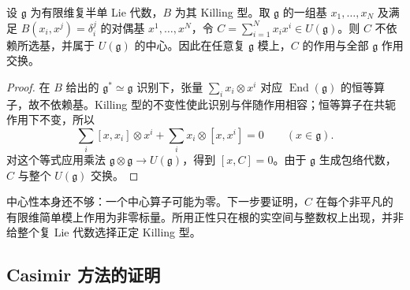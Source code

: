 \begin{proposition}\label{b5:prop:casimir-central}
	设 \(\mathfrak g\) 为有限维复半单 Lie 代数，\(B\) 为其 Killing 型。取 \(\mathfrak g\) 的一组基 \(x_1,\ldots,x_N\) 及满足 \(B(x_i,x^j)=\delta_i^j\) 的对偶基 \(x^1,\ldots,x^N\)，令 \(C=\sum_{i=1}^N x_ix^i\in U(\mathfrak g)\)。则 \(C\) 不依赖所选基，并属于 \(U(\mathfrak g)\) 的中心。因此在任意复 \(\mathfrak g\) 模上，\(C\) 的作用与全部 \(\mathfrak g\) 作用交换。
\end{proposition}
\begin{proof}
	在 \(B\) 给出的 \(\mathfrak g^*\simeq\mathfrak g\) 识别下，张量 \(\sum_i x_i\otimes x^i\) 对应 \(\operatorname{End}(\mathfrak g)\) 的恒等算子，故不依赖基。Killing 型的不变性使此识别与伴随作用相容；恒等算子在共轭作用下不变，所以
	\begin{equation}\label{b5:eq:casimir-tensor-invariance}
		\sum_i[x,x_i]\otimes x^i+\sum_i x_i\otimes[x,x^i]=0 \qquad(x\in\mathfrak g).
	\end{equation}
	对这个等式应用乘法 \(\mathfrak g\otimes\mathfrak g\to U(\mathfrak g)\)，得到 \([x,C]=0\)。由于 \(\mathfrak g\) 生成包络代数，\(C\) 与整个 \(U(\mathfrak g)\) 交换。
\end{proof}

中心性本身还不够：一个中心算子可能为零。下一步要证明，\(C\) 在每个非平凡的有限维简单模上作用为非零标量。所用正性只在根的实空间与整数权上出现，并非给整个复 Lie 代数选择正定 Killing 型。

\subsection{Casimir 方法的证明}
\label{b5:subsec:1801:02}

